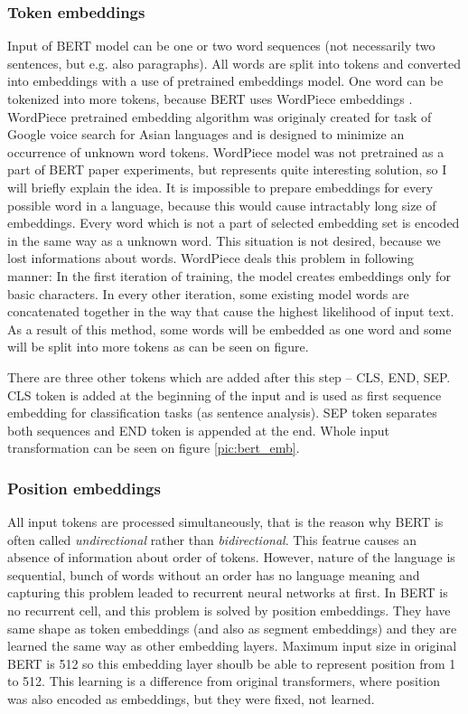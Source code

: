 \subsubsection*{Token embeddings}
Input of BERT model can be one or two word sequences (not necessarily two sentences, but e.g. also paragraphs). All words are split into tokens and converted into embeddings with a use of pretrained embeddings model. One word can be tokenized into more tokens, because BERT uses WordPiece %
embeddings \citep{Wu2016}. WordPiece pretrained embedding algorithm was originaly created for task of Google voice search for Asian languages and is designed to minimize an occurrence of unknown word tokens. %
WordPiece model was not pretrained as a part of BERT paper experiments, but represents quite interesting solution, so I will briefly explain the idea. It is impossible to prepare embeddings for every possible word in a language, because this would cause intractably long size of embeddings. Every word which is not a part of selected embedding set is encoded in the same way as a unknown word. This situation is not desired, because we lost informations about words. WordPiece deals this problem in following manner: In the first iteration of training, the model creates embeddings only for basic characters. In every other iteration, some existing model words are concatenated together in the way that cause the highest likelihood of input text. As a result of this method, some words will be embedded as one word and some will be split into more tokens as can be seen on figure. %
\par
There are three other tokens which are added after this step -- CLS, END, SEP. 
CLS token is added at the beginning of the input and is used as first sequence embedding for classification tasks (as sentence analysis). SEP token separates both sequences and END token is appended at the end. Whole input transformation can be seen on figure \ref{pic:bert_emb}.

\subsubsection*{Position embeddings}
All input tokens are processed simultaneously, that is the reason why BERT is often called \textit{undirectional} rather than \textit{bidirectional}. This featrue causes an absence of information about order of tokens. However, nature of the language is sequential, bunch of words without an order has no language meaning and capturing this problem leaded to recurrent neural networks at first. In BERT is no recurrent cell, and this problem is solved by position embeddings. They have same shape as token embeddings (and also as segment embeddings) and they are learned the same way as other embedding layers. Maximum input size in original BERT is 512 so this embedding layer shoulb be able to represent position from 1 to 512. This learning is a difference from original transformers, where position was also encoded as embeddings, but they  were fixed, not learned.

